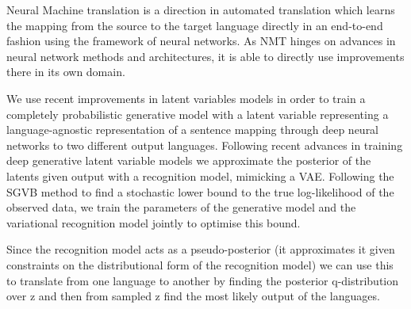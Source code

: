 Neural Machine translation is a direction in automated translation which learns
the mapping from the source to the target language directly in an end-to-end
fashion using the framework of neural networks. As NMT hinges on advances in
neural network methods and architectures, it is able to directly use
improvements there in its own domain.

We use recent improvements in latent variables models in order to train a
completely probabilistic generative model with a latent variable representing a
language-agnostic representation of a sentence mapping through deep neural
networks to two different output languages. Following recent advances in
training deep generative latent variable models we approximate the posterior of
the latents given output with a recognition model, mimicking a VAE. Following
the SGVB method to find a stochastic lower bound to the true log-likelihood of
the observed data, we train the parameters of the generative model and the
variational recognition model jointly to optimise this bound.

Since the recognition model acts as a pseudo-posterior (it approximates it given
constraints on the distributional form of the recognition model) we can use this
to translate from one language to another by finding the posterior
q-distribution over z and then from sampled z find the most likely output of the
languages.
